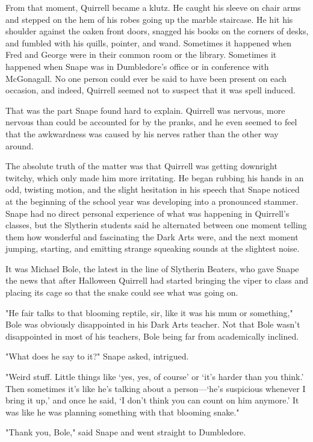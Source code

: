 From that moment, Quirrell became a klutz. He caught his sleeve on chair arms and stepped on the hem of his robes going up the marble staircase. He hit his shoulder against the oaken front doors, snagged his books on the corners of desks, and fumbled with his quills, pointer, and wand. Sometimes it happened when Fred and George were in their common room or the library. Sometimes it happened when Snape was in Dumbledore's office or in conference with McGonagall. No one person could ever be said to have been present on each occasion, and indeed, Quirrell seemed not to suspect that it was spell induced.

That was the part Snape found hard to explain. Quirrell was nervous, more nervous than could be accounted for by the pranks, and he even seemed to feel that the awkwardness was caused by his nerves rather than the other way around.

The absolute truth of the matter was that Quirrell was getting downright twitchy, which only made him more irritating. He began rubbing his hands in an odd, twisting motion, and the slight hesitation in his speech that Snape noticed at the beginning of the school year was developing into a pronounced stammer. Snape had no direct personal experience of what was happening in Quirrell's classes, but the Slytherin students said he alternated between one moment telling them how wonderful and fascinating the Dark Arts were, and the next moment jumping, starting, and emitting strange squeaking sounds at the slightest noise.

It was Michael Bole, the latest in the line of Slytherin Beaters, who gave Snape the news that after Halloween Quirrell had started bringing the viper to class and placing its cage so that the snake could see what was going on.

"He fair talks to that blooming reptile, sir, like it was his mum or something," Bole was obviously disappointed in his Dark Arts teacher. Not that Bole wasn't disappointed in most of his teachers, Bole being far from academically inclined.

"What does he say to it?" Snape asked, intrigued.

"Weird stuff. Little things like `yes, yes, of course' or `it's harder than you think.' Then sometimes it's like he's talking about a person—`he's suspicious whenever I bring it up,' and once he said, `I don't think you can count on him anymore.' It was like he was planning something with that blooming snake."

"Thank you, Bole," said Snape and went straight to Dumbledore.


